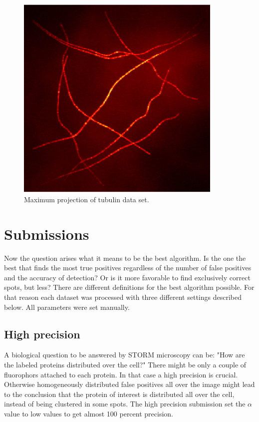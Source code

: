 \begin{figure}
\centering
\includegraphics[width = 0.88\textwidth]{pictures/maximumProjectionTubulinFarbig.png}
	\caption{Maximum projection of tubulin data set.}
	\label{pctMaximumProjTubulin}


\end{figure}

\section{Submissions}
Now the question arises what it means to be the best algorithm. Is the one the best that finds the most true positives regardless of the number of false positives and the accuracy of detection? Or is it more favorable to find exclusively correct spots, but less? There are different definitions for the best algorithm possible.\newline
For that reason each dataset was processed with three different settings described below. All parameters were set manually.
\subsection{High precision}
A biological question to be answered by STORM microscopy can be: "How are the labeled proteins distributed over the cell?" There might be only a couple of fluorophors attached to each protein. In that case a high precision is crucial. Otherwise homogeneously distributed false positives all over the image might lead to the conclusion that the protein of interest is distributed all over the cell, instead of being clustered in some spots.\newline
The high precision submission set the $\alpha$ value to low values to get almost 100 percent precision.
